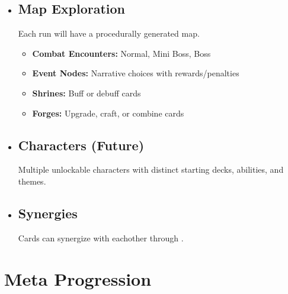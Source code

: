\documentclass[10pt, a4paper]{article}
\begin{document}
\begin{itemize}
		\item \subsection{Map Exploration}
		Each run will have a procedurally generated map.
		\begin{itemize}
			\item \textbf{Combat Encounters:} Normal, Mini Boss, Boss
			\item \textbf{Event Nodes:} Narrative choices with rewards/penalties
			\item \textbf{Shrines:} Buff or debuff cards
			\item \textbf{Forges:} Upgrade, craft, or combine cards
		\end{itemize}
		
		\item \subsection{Characters (Future)} Multiple unlockable characters with distinct starting decks, abilities, and themes.
		
		\item \subsection{Synergies} Cards can synergize with eachother through .
		\end{itemize}
	\section{Meta Progression}
	
\end{document}
